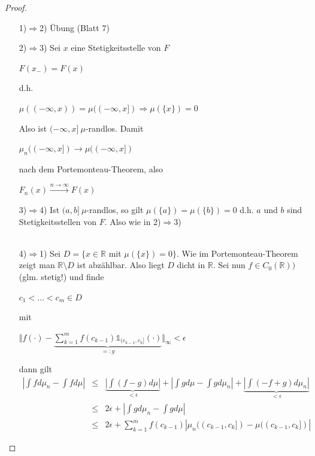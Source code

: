 \documentclass[10pt,a4paper]{report}
\newcommand{\R}{\mathbb{R}}
\numberwithin{equation}{section}
\numberwithin{figure}{section}
\theoremstyle{plain}
\theoremstyle{definition}
\theoremstyle{remark}
\theoremstyle{plain}
\newcommand{\1}{ \mathbb{1} } %
\begin{document}
\begin{proof} \ 
  \begin{itemize}
  \item[1)$\Rightarrow$2)] Übung (Blatt 7)
  \item[2)$\Rightarrow$3)] Sei $x$ eine Stetigkeitsstelle von $F$
    \begin{center}
      $F(x_-)=F(x)$
    \end{center}
    d.h.
    \begin{center}
      $\mu((-\infty,x))=\mu((-\infty,x]) \Rightarrow \mu(\{x\})=0$
    \end{center}
    Also ist $(-\infty,x]~\mu$-randlos. Damit
    \begin{center}
      $\mu_n((-\infty,x])\to\mu((-\infty,x])$
    \end{center}
    nach dem Portemonteau-Theorem, also
    \begin{center}
      $F_n(x) \overset{n \to \infty}{\to} F(x)$
    \end{center}
    \item[3)$\Rightarrow$4)] Ist $(a,b]~\mu$-randlos, so gilt $\mu(\{a\})=\mu(\{b\})=0$ d.h. $a$ und $b$ sind Stetigkeitsstellen von $F$. Also wie in 2)$\Rightarrow$3)\\\\
    \item[4)$\Rightarrow$1)] Sei $D=\{x \in \R $ mit $\mu(\{x\})=0\}$. Wie im
    Portemonteau-Theorem zeigt man $\R\setminus D$ ist abzählbar. Also
    liegt $D$ dicht in $\R$. Sei nun $f \in C_0(\R))$ (glm. stetig!)
    und finde
    \begin{center}
      $c_1<\ldots<c_m \in D$
    \end{center}
    mit
    \begin{center}
      $\Vert f(\cdot)-\underbrace{\sum\limits_{k=1}^m
        f(c_{k-1})\1_{(c_{k-1},c_k]}(\cdot)}_{=:g}\Vert_\infty <
      \epsilon$
    \end{center}
    dann gilt
    \begin{eqnarray*}
      \left|\int fd\mu_n-\int fd\mu\right|&\leq &\underbrace{\left|\int(f-g)d\mu\right|}_{<\epsilon}+\left|\int gd\mu-\int g d\mu_n\right|+\underbrace{\left|\int(-f+g)d\mu_n \right|}_{<\epsilon}\\
      &\leq & 2\epsilon + \left|\int g d\mu_n-\int gd\mu\right|\\
      &\leq & 2\epsilon + \sum\limits_{k=1}^m f(c_{k-1})|\mu_n((c_{k-1},c_k])-\mu((c_{k-1},c_k])|
    \end{eqnarray*}
  \end{itemize}
\end{proof}
\end{document}
